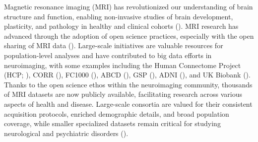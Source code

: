 Magnetic resonance imaging (MRI) has revolutionized our understanding of brain structure and function,
enabling non-invasive studies of brain development, plasticity, and pathology in healthy and clinical cohorts (\cite{katti2011magnetic, mills2014methods}).
MRI research has advanced through the adoption of open science practices, especially 
with the open sharing of MRI data (\cite{snoek2021amsterdam, van2013wu, miller2016multimodal, di2014autism}).
Large-scale initiatives are valuable resources for population-level analyses 
and have contributed to big data efforts in neuroimaging, with some examples including the 
Human Connectome Project (HCP; \cite{van2013wu}), CORR (\cite{gorgolewski2017preprocessed}), 
FC1000 (\cite{biswal2010toward}), ABCD (\cite{casey2018adolescent}), GSP (\cite{holmes2015brain}), ADNI (\cite{mueller2005alzheimer}), 
and UK Biobank (\cite{miller2016multimodal}). 
Thanks to the open science ethos within the neuroimaging community, thousands of MRI datasets are now publicly available, 
facilitating research across various aspects of health and disease. 
Large-scale consortia are valued for their consistent acquisition protocols, 
enriched demographic details, and broad population coverage, 
while smaller specialized datasets remain critical for studying neurological and psychiatric disorders 
(\cite{soler2022brain, fajardo2024functional, gibson2024aphasia}). 


